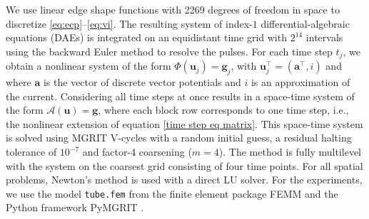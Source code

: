 \documentclass[VANCOUVER,STIX1COL]{WileyNJD-v2}
\begin{document}
We use linear edge shape functions with 2269 degrees of freedom in space to discretize \eqref{eq:ecp}--\eqref{eq:vi}. The resulting system of index-$1$ differential-algebraic equations (DAEs) is integrated on an equidistant time grid with $2^{14}$ intervals using the backward Euler method to resolve the pulses. For each time step $t_j$, we obtain a nonlinear system of the form $\Phi(\mathbf{u}_j)=\mathbf{g}_j$, with $\mathbf{u}^{\!\top}_j=(\mathbf{a}^{\!\top}, i)$ and where $\mathbf{a}$ is the vector of discrete vector potentials and $i$ is an approximation of the current. Considering all time steps at once results in a space-time system of the form $\mathcal{A}(\textbf{u}) = \textbf{g}$, where each block row corresponds to one time step, i.e., the nonlinear extension of equation \eqref{time step eq matrix}. This space-time system is solved using MGRIT V-cycles with a random initial guess, a  residual halting tolerance of $10^{-7}$ and factor-4 coarsening ($m=4$). The method is fully multilevel with the system on the coarsest grid consisting of four time points. %
For all spatial problems, Newton's method is used with a direct LU solver. For the experiments, we use the model \texttt{tube.fem} from the finite element package FEMM\cite{FEMM} and the Python framework PyMGRIT \cite{PyMGRIT,JHahne2021}. 
\end{document}
